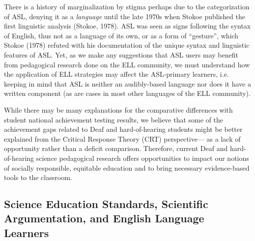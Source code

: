 \documentclass[11.5pt]{sig-alternate} %
\begin{document}
\begin{large}
There is a history of marginalization by stigma perhaps due to the categorization of ASL, denying it as a \textit{language} until the late 1970s when Stokoe published the first linguistic analysis (Stokoe, 1978). ASL was seen as signs following the syntax of English, thus not as a language of its own, or as a form of “gesture”, which Stokoe (1978) refuted with his documentation of the unique syntax and linguistic features of ASL. Yet, as we make any suggestions that ASL users may benefit from pedagogical research done on the ELL community, we must understand how the application of ELL strategies may affect the ASL-primary learners, i.e. keeping in mind that ASL is neither an audibly-based language nor does it have a written component (as are cases in most other languages of the ELL community). 

While there may be many explanations for the comparative differences with student national achievement testing results, we believe that some of the achievement gaps related to Deaf and hard-of-hearing students might be better explained from the Critical Response Theory (CRT) perspective— as a lack of opportunity rather than a deficit comparison. Therefore, current Deaf and hard-of-hearing science pedagogical research offers opportunities to impact our notions of socially responsible, equitable education and to bring necessary evidence-based tools to the classroom.

\subsection*{Science Education Standards, Scientific Argumentation, and English Language Learners}


\end{large}
\end{document}

